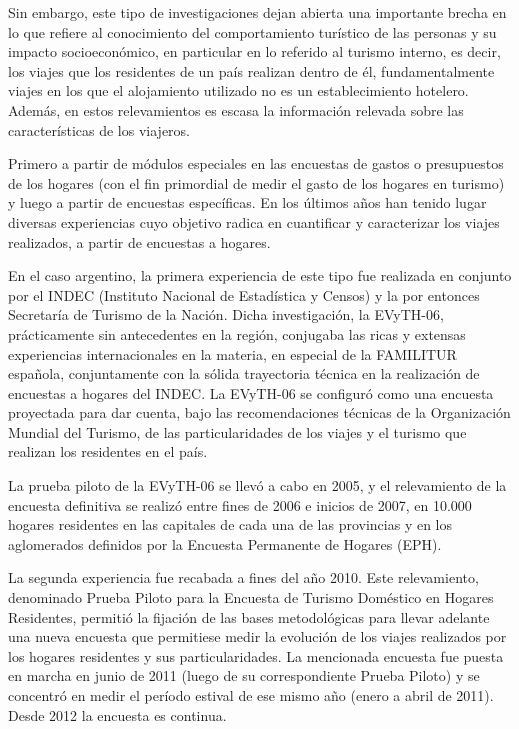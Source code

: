 \documentclass[
  openany]{book}
\begin{document}
Sin embargo, este tipo de investigaciones dejan abierta una importante brecha en lo que refiere al conocimiento del comportamiento turístico de las personas y su impacto socioeconómico, en particular en lo referido al turismo interno, es decir, los viajes que los residentes de un país realizan dentro de él, fundamentalmente viajes en los que el alojamiento utilizado no es un establecimiento hotelero. Además, en estos relevamientos es escasa la información relevada sobre las características de los viajeros.

Primero a partir de módulos especiales en las encuestas de gastos o presupuestos de los hogares (con el fin primordial de medir el gasto de los hogares en turismo) y luego a partir de encuestas específicas. En los últimos años han tenido lugar diversas experiencias cuyo objetivo radica en cuantificar y caracterizar los viajes realizados, a partir de encuestas a hogares.

En el caso argentino, la primera experiencia de este tipo fue realizada en conjunto por el INDEC (Instituto Nacional de Estadística y Censos) y la por entonces Secretaría de Turismo de la Nación. Dicha investigación, la EVyTH-06, prácticamente sin antecedentes en la región, conjugaba las ricas y extensas experiencias internacionales en la materia, en especial de la FAMILITUR española, conjuntamente con la sólida trayectoria técnica en la realización de encuestas a hogares del INDEC. La EVyTH-06 se configuró como una encuesta proyectada para dar cuenta, bajo las recomendaciones técnicas de la Organización Mundial del Turismo, de las particularidades de los viajes y el turismo que realizan los residentes en el país.

La prueba piloto de la EVyTH-06 se llevó a cabo en 2005, y el relevamiento de la encuesta definitiva se realizó entre fines de 2006 e inicios de 2007, en 10.000 hogares residentes en las capitales de cada una de las provincias y en los aglomerados definidos por la Encuesta Permanente de Hogares (EPH).

La segunda experiencia fue recabada a fines del año 2010. Este relevamiento, denominado Prueba Piloto para la Encuesta de Turismo Doméstico en Hogares Residentes, permitió la fijación de las bases metodológicas para llevar adelante una nueva encuesta que permitiese medir la evolución de los viajes realizados por los hogares residentes y sus particularidades. La mencionada encuesta fue puesta en marcha en junio de 2011 (luego de su correspondiente Prueba Piloto) y se concentró en medir el período estival de ese mismo año (enero a abril de 2011). Desde 2012 la encuesta es continua.
\end{document}
